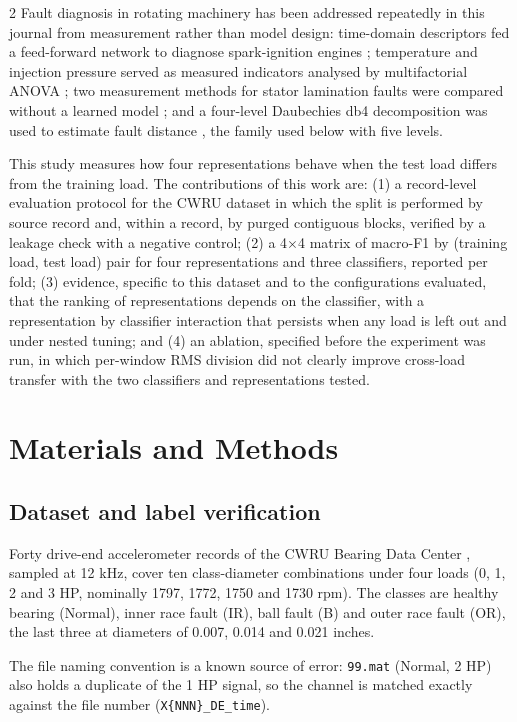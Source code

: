 \documentclass[12pt,twoside,titlepage]{ingenius}
\begin{document}
\begin{multicols}{2}
Fault diagnosis in rotating machinery has been addressed repeatedly in this
journal from measurement rather than model design: time-domain descriptors fed a feed-forward network to diagnose spark-ignition
engines \cite{contreras2019}; temperature and injection pressure served as measured indicators analysed by multifactorial ANOVA \cite{llanes2019}; two measurement methods for stator lamination faults
were compared without a learned model \cite{salazar2012}; and a four-level
Daubechies db4 decomposition was used to estimate fault distance
\cite{gomez2023}, the family used below with five levels.

This study measures how four representations behave when the test load differs
from the training load. The contributions of this work are: (1) a
record-level evaluation protocol for the CWRU dataset in which the split is
performed by source record and, within a record, by purged contiguous blocks,
verified by a leakage check with a negative control; (2) a 4$\times$4 matrix of
macro-F1 by (training load, test load) pair for four representations and three
classifiers, reported per fold; (3) evidence, specific to this dataset and to
the configurations evaluated, that the ranking of representations depends on the
classifier, with a representation by classifier interaction that persists when
any load is left out and under nested tuning; and (4) an ablation, specified
before the experiment was run, in which per-window RMS division did not clearly improve
cross-load transfer with the two classifiers and representations tested.

\section{Materials and Methods}

\subsection{Dataset and label verification}

Forty drive-end accelerometer records of the CWRU Bearing Data Center
\cite{cwru}, sampled at 12 kHz, cover ten class-diameter combinations under four
loads (0, 1, 2 and 3 HP, nominally 1797, 1772, 1750 and 1730 rpm). The classes
are healthy bearing (Normal), inner race fault (IR), ball fault (B) and outer
race fault (OR), the last three at diameters of 0.007, 0.014 and 0.021 inches.

The file naming convention is a known source of error: \texttt{99.mat} (Normal,
2 HP) also holds a duplicate of the 1 HP signal, so the channel is matched
exactly against the file number (\texttt{X\{NNN\}\_DE\_time}).


\end{multicols}
\end{document}
